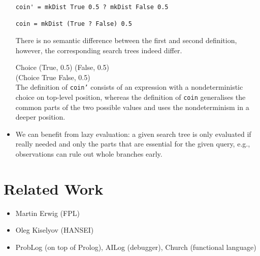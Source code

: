 \documentclass[
12pt, %
a4paper, %
oneside, %
]{llncs}
\newcommand{\code}[1]{{\texttt{#1}}}
\begin{document}
\begin{itemize}
\begin{verbatim}
coin' = mkDist True 0.5 ? mkDist False 0.5

coin = mkDist (True ? False) 0.5
\end{verbatim}

  There is no semantic difference between the first and second
  definition, however, the corresponding search trees indeed differ. %

  Choice (True, 0.5) (False, 0.5)\\%
  (Choice True False, 0.5)\\%

  The definition of \code{coin'} consists of an expression with a
  nondeterministic choice on top-level position, whereas the
  definition of \code{coin} generalises the common parts of the two
  possible values and uses the nondeterminism in a deeper position. %


\item We can benefit from lazy evaluation: a given search tree is only
  evaluated if really needed and only the parts that are essential for
  the given query, e.g., observations can rule out whole branches
  early. %
  
\end{itemize}

\section{Related Work}

\begin{itemize}
\item Martin Erwig (FPL)
\item Oleg Kiselyov (HANSEI)
\item ProbLog (on top of Prolog), AILog (debugger), Church (functional
  language)
\end{itemize}
\end{document}
